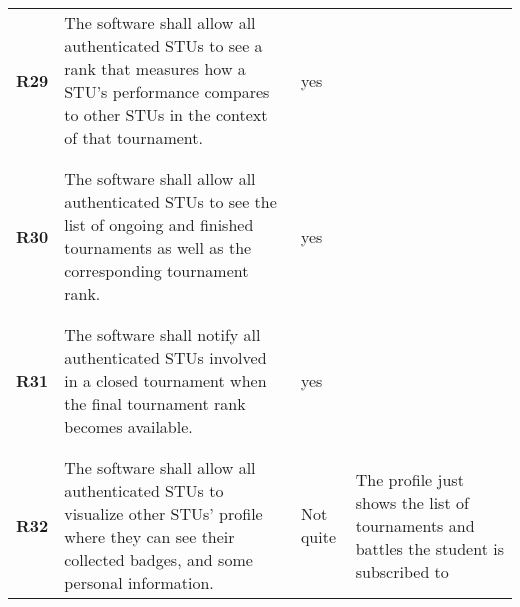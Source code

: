 \begin{longtable}[H]{l p{8cm} l p{2cm}}
    \textbf{R29} & The software shall allow all authenticated STUs to see a rank that measures how a STU's performance compares to other STUs in the context of that tournament.                                                         & {\color{green}yes}   &                                                                                         \\
                 &                                                                                                                                                                                                                       &                      &                                                                                         \\\hline & & & \\
    \textbf{R30} & The software shall allow all authenticated STUs to see the list of ongoing and finished tournaments as well as the corresponding tournament rank.                                                                     & {\color{green}yes}   &                                                                                         \\
                 &                                                                                                                                                                                                                       &                      &                                                                                         \\\hline & & & \\
    \textbf{R31} & The software shall notify all authenticated STUs involved in a closed tournament when the final tournament rank becomes available.                                                                                    & {\color{green}yes}   &                                                                                         \\
                 &                                                                                                                                                                                                                       &                      &                                                                                         \\\hline & & & \\
    \textbf{R32} & The software shall allow all authenticated STUs to visualize other STUs' profile where they can see their collected badges, and some personal information.                                                            & Not quite            & The profile just shows the list of tournaments and battles the student is subscribed to \\

\end{longtable}
